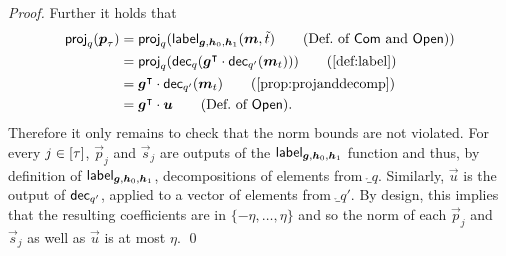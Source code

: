 \begin{proof}
Further it holds that
\begin{align*}
  \projmod{q}(\vec{p}_{\tau})
  ={}&\projmod{q}(\lbl_{\vec{g},\vec{h}_0,\vec{h}_1}(\vec{m},\tilde t)\tag{Def.\ of $\commit$ and $\open$})\\
  ={}&\projmod{q}(\decompmod{q}(\vec{g}^\transpose\cdot \decompmod{q'}(\vec{m}_t)))\tag{\autoref{def:label}}\\
  ={}&\vec{g}^\transpose\cdot \decompmod{q'}(\vec{m}_t)\tag{\autoref{prop:projanddecomp}}\\
  ={}&\vec{g}^\transpose\cdot\vec{u}\tag{Def.\ of $\open$}.
\end{align*}
%
Therefore it only remains to check that the norm bounds are not violated.
For every $j\in[\tau]$, $\vec{p}_j$ and $\vec{s}_j$ are outputs of the $\mathsf{label}_{\boldsymbol{g},\boldsymbol{h}_0,\boldsymbol{h}_1}$ function and thus, by definition of $\mathsf{label}_{\boldsymbol{g},\boldsymbol{h}_0,\boldsymbol{h}_1}$, decompositions of elements from $\ring_q$.
Similarly, $\vec{u}$ is the output of $\mathsf{dec}_{q'}$, applied to a vector of elements from $\ring_{q'}$.
By design, this implies that the resulting coefficients are in $\{-\eta,\dots,\eta\}$ and so the norm of each $\vec{p}_j$ and $\vec{s}_j$ as well as $\vec{u}$ is at most $\eta$.
\qed
\end{proof}


%   
% 


